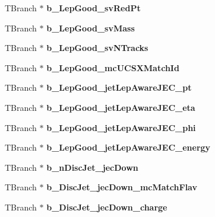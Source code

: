 \begin{DoxyCompactItemize}
T\+Branch $\ast$ {\bfseries b\+\_\+\+Lep\+Good\+\_\+sv\+Red\+Pt}
\item 
\hypertarget{classMiniTree_a91c2aeacbc8b4c1412cf495dad28faa9}{}\label{classMiniTree_a91c2aeacbc8b4c1412cf495dad28faa9} 
T\+Branch $\ast$ {\bfseries b\+\_\+\+Lep\+Good\+\_\+sv\+Mass}
\item 
\hypertarget{classMiniTree_a60fcd843ff660c0e5ea4ba24e593342a}{}\label{classMiniTree_a60fcd843ff660c0e5ea4ba24e593342a} 
T\+Branch $\ast$ {\bfseries b\+\_\+\+Lep\+Good\+\_\+sv\+N\+Tracks}
\item 
\hypertarget{classMiniTree_ae566de3325b47cc5b3d82535a63679cb}{}\label{classMiniTree_ae566de3325b47cc5b3d82535a63679cb} 
T\+Branch $\ast$ {\bfseries b\+\_\+\+Lep\+Good\+\_\+mc\+U\+C\+S\+X\+Match\+Id}
\item 
\hypertarget{classMiniTree_ae0ada93fc55dd94716c678002ba52190}{}\label{classMiniTree_ae0ada93fc55dd94716c678002ba52190} 
T\+Branch $\ast$ {\bfseries b\+\_\+\+Lep\+Good\+\_\+jet\+Lep\+Aware\+J\+E\+C\+\_\+pt}
\item 
\hypertarget{classMiniTree_ab83661fcd227c2f828e2096a2b18a6b2}{}\label{classMiniTree_ab83661fcd227c2f828e2096a2b18a6b2} 
T\+Branch $\ast$ {\bfseries b\+\_\+\+Lep\+Good\+\_\+jet\+Lep\+Aware\+J\+E\+C\+\_\+eta}
\item 
\hypertarget{classMiniTree_a641204165ce6be747636ec4317ddfa25}{}\label{classMiniTree_a641204165ce6be747636ec4317ddfa25} 
T\+Branch $\ast$ {\bfseries b\+\_\+\+Lep\+Good\+\_\+jet\+Lep\+Aware\+J\+E\+C\+\_\+phi}
\item 
\hypertarget{classMiniTree_ab51b3df6cfa89a598f571b818eeb9230}{}\label{classMiniTree_ab51b3df6cfa89a598f571b818eeb9230} 
T\+Branch $\ast$ {\bfseries b\+\_\+\+Lep\+Good\+\_\+jet\+Lep\+Aware\+J\+E\+C\+\_\+energy}
\item 
\hypertarget{classMiniTree_a217a37674a50116801cce7c7f10c520f}{}\label{classMiniTree_a217a37674a50116801cce7c7f10c520f} 
T\+Branch $\ast$ {\bfseries b\+\_\+n\+Disc\+Jet\+\_\+jec\+Down}
\item 
\hypertarget{classMiniTree_a54c4db6e1eb831ce222ce979d39db171}{}\label{classMiniTree_a54c4db6e1eb831ce222ce979d39db171} 
T\+Branch $\ast$ {\bfseries b\+\_\+\+Disc\+Jet\+\_\+jec\+Down\+\_\+mc\+Match\+Flav}
\item 
\hypertarget{classMiniTree_a3e66219a66912042c466bf11c22f31fb}{}\label{classMiniTree_a3e66219a66912042c466bf11c22f31fb} 
T\+Branch $\ast$ {\bfseries b\+\_\+\+Disc\+Jet\+\_\+jec\+Down\+\_\+charge}
\item 
\hypertarget{classMiniTree_a0652f46d4f0b647603d8fc38c6875186}{}\label{classMiniTree_a0652f46d4f0b647603d8fc38c6875186} 

\end{DoxyCompactItemize}
